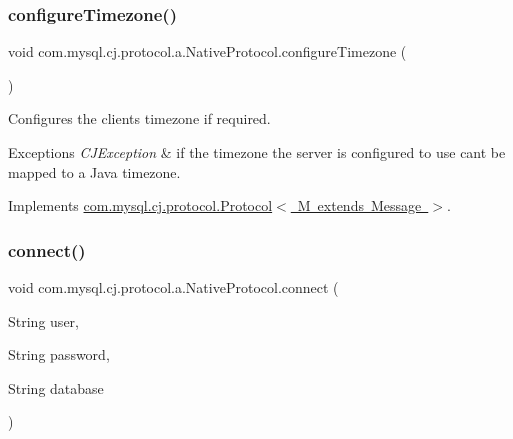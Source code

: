 \mbox{\label{classcom_1_1mysql_1_1cj_1_1protocol_1_1a_1_1_native_protocol_a125fe378f81937bcf676327f270f8025}} 
\subsubsection{\texorpdfstring{configure\+Timezone()}{configureTimezone()}}
{\footnotesize\ttfamily void com.\+mysql.\+cj.\+protocol.\+a.\+Native\+Protocol.\+configure\+Timezone (\begin{DoxyParamCaption}{ }\end{DoxyParamCaption})}

Configures the client\textquotesingle{}s timezone if required.


\begin{DoxyExceptions}{Exceptions}
{\em C\+J\+Exception} & if the timezone the server is configured to use can\textquotesingle{}t be mapped to a Java timezone. \\
\hline
\end{DoxyExceptions}


Implements \mbox{\hyperlink{interfacecom_1_1mysql_1_1cj_1_1protocol_1_1_protocol_a21ceb9181ddbbf615ead4ad2e24e5544}{com.\+mysql.\+cj.\+protocol.\+Protocol$<$ M extends Message $>$}}.

\mbox{\label{classcom_1_1mysql_1_1cj_1_1protocol_1_1a_1_1_native_protocol_ad567528560d84a107a288dd1c08fb9ce}} 
\subsubsection{\texorpdfstring{connect()}{connect()}}
{\footnotesize\ttfamily void com.\+mysql.\+cj.\+protocol.\+a.\+Native\+Protocol.\+connect (\begin{DoxyParamCaption}\item[{String}]{user,  }\item[{String}]{password,  }\item[{String}]{database }\end{DoxyParamCaption})}

